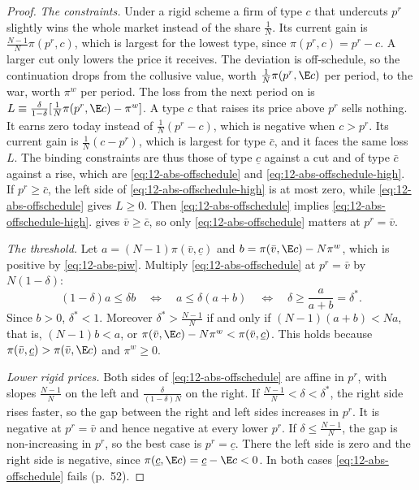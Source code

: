 \begin{proof}
\emph{The constraints.} Under a rigid scheme a firm of type $c$ that undercuts $p^r$ slightly wins the whole market
instead of the share $\frac{1}{N}$. Its current gain is $\frac{N - 1}{N}\pi(p^r, c)$, which is largest for the
lowest type, since $\pi(p^r, c) = p^r - c$. A larger cut only lowers the price it receives. The deviation is
off-schedule, so the continuation drops from the collusive value, worth $\frac{1}{N}\pi(p^r, \E c)$ per period, to
the war, worth $\pi^w$ per period. The loss from the next period on is
$L \equiv \frac{\delta}{1 - \delta}[\frac{1}{N}\pi(p^r, \E c) - \pi^w]$. A type $c$ that raises its price above $p^r$
sells nothing. It earns zero today instead of $\frac{1}{N}(p^r - c)$, which is negative when $c > p^r$. Its current
gain is $\frac{1}{N}(c - p^r)$, which is largest for type $\bar c$, and it faces the same loss $L$. The binding
constraints are thus those of type $\underline c$ against a cut and of type $\bar c$ against a rise, which are
\eqref{eq:12-abs-offschedule} and \eqref{eq:12-abs-offschedule-high}. If $p^r \ge \bar c$, the left side of
\eqref{eq:12-abs-offschedule-high} is at most zero, while \eqref{eq:12-abs-offschedule} gives $L \ge 0$. Then
\eqref{eq:12-abs-offschedule} implies \eqref{eq:12-abs-offschedule-high}.  gives
$\bar v \ge \bar c$, so only \eqref{eq:12-abs-offschedule} matters at $p^r = \bar v$.

\emph{The threshold.} Let $a = (N - 1)\pi(\bar v, \underline c)$ and $b = \pi(\bar v, \E c) - N\pi^w$, which is
positive by \eqref{eq:12-abs-piw}. Multiply \eqref{eq:12-abs-offschedule} at $p^r = \bar v$ by $N(1 - \delta)$:
\begin{equation*}
(1 - \delta)a \le \delta b
\quad\Longleftrightarrow\quad
a \le \delta(a + b)
\quad\Longleftrightarrow\quad
\delta \ge \frac{a}{a + b} = \delta^* .
\end{equation*}
Since $b > 0$, $\delta^* < 1$. Moreover $\delta^* > \frac{N - 1}{N}$ if and only if $(N - 1)(a + b) < Na$, that is,
$(N - 1)b < a$, or $\pi(\bar v, \E c) - N\pi^w < \pi(\bar v, \underline c)$. This holds because
$\pi(\bar v, \underline c) > \pi(\bar v, \E c)$ and $\pi^w \ge 0$.

\emph{Lower rigid prices.} Both sides of \eqref{eq:12-abs-offschedule} are affine in $p^r$, with slopes
$\frac{N - 1}{N}$ on the left and $\frac{\delta}{(1 - \delta)N}$ on the right. If $\frac{N - 1}{N} < \delta < \delta^*$,
the right side rises faster, so the gap between the right and left sides increases in $p^r$. It is negative at
$p^r = \bar v$ and hence negative at every lower $p^r$. If $\delta \le \frac{N - 1}{N}$, the gap is non-increasing in
$p^r$, so the best case is $p^r = \underline c$. There the left side is zero and the right side is negative, since
$\pi(\underline c, \E c) = \underline c - \E c < 0$. In both cases \eqref{eq:12-abs-offschedule} fails (p.~52).
\end{proof}

